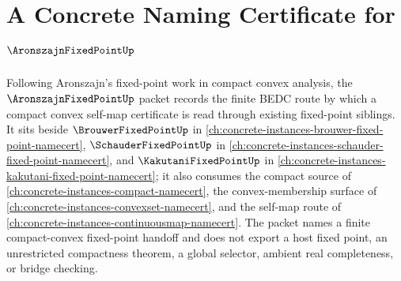 \chapter{A Concrete Naming Certificate for $\AronszajnFixedPointUp$}
\label{ch:concrete-instances-aronszajn-fixed-point-namecert}

Following Aronszajn's fixed-point work in compact convex analysis, the $\AronszajnFixedPointUp$ packet records the finite BEDC route by which a compact convex self-map certificate is read through existing fixed-point siblings. It sits beside $\BrouwerFixedPointUp$ in \autoref{ch:concrete-instances-brouwer-fixed-point-namecert}, $\SchauderFixedPointUp$ in \autoref{ch:concrete-instances-schauder-fixed-point-namecert}, and $\KakutaniFixedPointUp$ in \autoref{ch:concrete-instances-kakutani-fixed-point-namecert}; it also consumes the compact source of \autoref{ch:concrete-instances-compact-namecert}, the convex-membership surface of \autoref{ch:concrete-instances-convexset-namecert}, and the self-map route of \autoref{ch:concrete-instances-continuousmap-namecert}. The packet names a finite compact-convex fixed-point handoff and does not export a host fixed point, an unrestricted compactness theorem, a global selector, ambient real completeness, or bridge checking.

